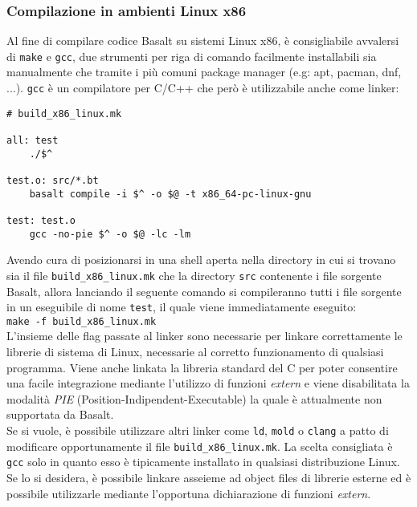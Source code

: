 \subsubsection{Compilazione in ambienti Linux x86}
Al fine di compilare codice Basalt su sistemi Linux x86, 
è consigliabile avvalersi di \texttt{make} e \texttt{gcc}, due strumenti per 
riga di comando facilmente installabili sia manualmente che tramite i più comuni 
package manager (e.g: apt, pacman, dnf, ...). \texttt{gcc} è un compilatore per C/C++ che 
però è utilizzabile anche come linker: \\


\vspace{0.5cm}
\begin{lstlisting}[frame=single]
# build_x86_linux.mk

all: test
	./$^

test.o: src/*.bt
	basalt compile -i $^ -o $@ -t x86_64-pc-linux-gnu

test: test.o
	gcc -no-pie $^ -o $@ -lc -lm

\end{lstlisting}
\vspace{0.5cm}

Avendo cura di posizionarsi in una shell aperta nella directory in cui si 
trovano sia il file \texttt{build\_x86\_linux.mk} che la 
directory \texttt{src} contenente i file sorgente Basalt, allora 
lanciando il seguente comando si compileranno tutti i file sorgente in un 
eseguibile di nome \texttt{test}, il quale viene immediatamente eseguito: \\

\noindent\hfill \texttt{make -f build\_x86\_linux.mk} \hfill\null \\

L'insieme delle flag passate al linker sono necessarie per
linkare correttamente le librerie di sistema di Linux, necessarie al corretto 
funzionamento di qualsiasi programma. Viene anche linkata la libreria standard 
del C per poter consentire una facile integrazione mediante l'utilizzo di 
funzioni \textit{extern} e viene disabilitata la modalità \textit{PIE} (Position-Indipendent-Executable)
la quale è attualmente non supportata da Basalt. \\

Se si vuole, è possibile utilizzare altri linker come \texttt{ld}, \texttt{mold} o \texttt{clang} a patto
di modificare opportunamente il file \texttt{build\_x86\_linux.mk}. La scelta consigliata è \texttt{gcc} 
solo in quanto esso è tipicamente installato in qualsiasi distribuzione Linux. \\

Se lo si desidera, è possibile linkare asseieme ad object files di librerie esterne 
ed è possibile utilizzarle mediante l'opportuna dichiarazione di funzioni \textit{extern}. \\

\newpage